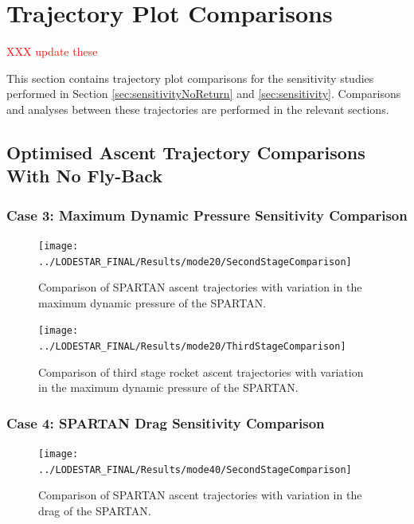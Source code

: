 		
		\chapter{Trajectory Plot Comparisons}\label{sec:Appendix_trajectorycomparisons}
		
		\textcolor{red}{XXX update these}
		
This section contains trajectory plot comparisons for the sensitivity studies performed in Section \ref{sec:sensitivityNoReturn} and \ref{sec:sensitivity}. Comparisons and analyses between these trajectories are performed in the relevant sections. 
		\clearpage
		\section{Optimised Ascent Trajectory Comparisons With No Fly-Back}
		
		\subsection{Case 3: Maximum Dynamic Pressure Sensitivity Comparison}\label{sec:app_comparison20}
		
		
\begin{figure}[!ht]
\centering
\texttt{[image: ../LODESTAR\_FINAL/Results/mode20/SecondStageComparison]}
\caption{Comparison of SPARTAN ascent trajectories with variation in the maximum dynamic pressure of the SPARTAN.}
\label{fig:SecondStageComparison1}
\end{figure}

\begin{figure}[!th]
\centering
\texttt{[image: ../LODESTAR\_FINAL/Results/mode20/ThirdStageComparison]}
\caption{Comparison of third stage rocket ascent trajectories with variation in the maximum dynamic pressure of the SPARTAN.}
\label{fig:ThirdStageComparison1}
\end{figure}
\FloatBarrier

\clearpage

\subsection{Case 4: SPARTAN Drag Sensitivity Comparison}\label{sec:app_comparison40}

\begin{figure}[!th]
\centering
\texttt{[image: ../LODESTAR\_FINAL/Results/mode40/SecondStageComparison]}
\caption{Comparison of SPARTAN ascent trajectories with variation in the drag of the SPARTAN.}
\label{fig:SecondStageComparison3}
\end{figure}


